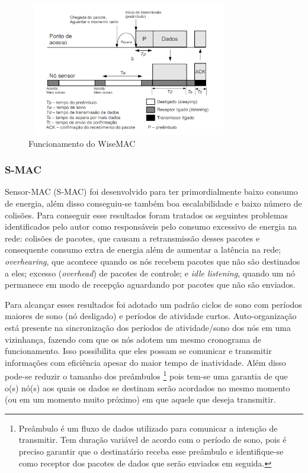 \begin{figure}[!htb]
\centering
\includegraphics[width=340px,height=220px]{./Pictures/wisemac.png}
\caption{Funcionamento do WiseMAC \cite{El-Hoiydi2004}} %
\label{fig:wisemac} %
\end{figure}

 \subsubsection{S-MAC}
 \label{sec:smac}
 
Sensor-MAC (S-MAC) \cite{ye04} foi desenvolvido para ter primordialmente baixo consumo de energia, além disso conseguiu-se também boa escalabilidade e baixo número de colisões. Para conseguir esse resultados foram tratados os seguintes problemas identificados pelo autor como responsáveis pelo consumo excessivo de energia na rede: colisões de pacotes, que causam a retransmissão desses pacotes e consequente consumo extra de energia além de aumentar a latência na rede; \textit{overhearing}, que acontece quando os nós recebem pacotes que não são destinados a eles; excesso (\textit{overhead}) de pacotes de controle; e \textit{idle listening}, quando um nó permanece em modo de recepção aguardando por pacotes que não são enviados.

Para alcançar esses resultados foi adotado um padrão ciclos de sono com períodos maiores de sono (nó desligado) e períodos de atividade curtos. Auto-organização está presente na sincronização dos períodos de atividade/sono dos nós em uma vizinhança, fazendo com que os nós adotem um mesmo cronograma de funcionamento. Isso possibilita que eles possam se comunicar e transmitir informações com eficiência apesar do maior tempo de inatividade. Além disso pode-se reduzir o tamanho dos preâmbulos%
 \footnote{Preâmbulo é um fluxo de dados utilizado para comunicar a intenção de transmitir. Tem duração variável de acordo com o período de sono, pois é preciso garantir que o destinatário receba esse preâmbulo e identifique-se como receptor dos pacotes de dados que serão enviados em seguida.}
 pois tem-se uma garantia de que o(s) nó(s) aos quais os dados se destinam serão acordados no mesmo momento (ou em um momento muito próximo) em que aquele que deseja transmitir.
 
